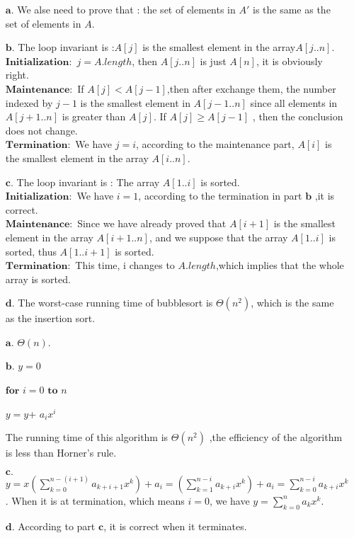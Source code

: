 \documentclass[a4paper, justified]{tufte-handout}
\begin{document}
\begin{solution}
\begin{enumerate}
    \item [$\bm{a.}$] We alse need to prove that : the set of elements in $A'$ is the same as the set of elements in $A$.
    \item [$\bm{b.}$] The loop invariant is :$A[j]$ is the smallest element in the array$A[j..n]$.\\ $\bm{Initialization:}$ $j=A.length$, then $A[j..n]$ is just $A[n]$, it is obviously right. \\$\bm{Maintenance:}$ If $A[j] < A[j-1]$,then after exchange them, the number indexed by $j-1$ is the smallest element in $A[j-1..n]$ since all elements in $A[j+1..n]$ is greater than $A[j]$. If $A[j] \ge A[j-1]$ , then the conclusion does not change. \\$\bm{Termination:}$ We have $j=i$, according to the maintenance part, $A[i]$ is the smallest element in the array $A[i..n]$.
    \item [$\bm{c.}$] The loop invariant is : The array $A[1..i]$ is sorted.\\ $\bm{Initialization:}$ We have $i=1$, according to the termination in part $\bm{b}$ ,it is correct.\\ $\bm{Maintenance:}$ Since we have already proved that $A[i+1]$ is the smallest element in the array $A[i+1..n]$, and we suppose that the array $A[1..i]$ is sorted, thus $A[1..i+1]$ is sorted.\\ $\bm{Termination:}$ This time, i changes to $A.length$,which implies that the whole array is sorted.
    \item [$\bm{d.}$] The worst-case running time of bubblesort is $\Theta(n^{2})$, which is the same as the insertion sort.
\end{enumerate}
\end{solution}

\begin{problem}[TC Problem $2-3$]
\end{problem}

\begin{solution}
\begin{enumerate}
    \item [$\bm{a.}$] $\Theta(n)$.
    \item [$\bm{b.}$] $y = 0$\par
    $\bm{for}$ $i = 0$ $\bm{to}$ $n$ \par
    \hspace{2em} $y = y $+  $a_ix^{i}$\par
    The running time of this algorithm is $\Theta(n^{2})$ ,the efficiency of the algorithm is less than Horner's rule. 
    \item [$\bm{c.}$] $y = x\left(\sum_{k=0}^{n-(i+1)}{a_{k+i+1}x^{k}}\right)+a_i = \left(\sum_{k=1}^{n-i}{a_{k+i}x^{k}}\right)+a_{i} = \sum_{k=0}^{n-i}{a_{k+i}x^{k}}$.
    When it is at termination, which means $i=0$, we have $y=\sum_{k=0}^{n}{a_k}x^{k}$.
    \item [$\bm{d.}$] According to part $\bm{c}$, it is correct when it terminates.
\end{enumerate}
\end{solution}
\end{document}
